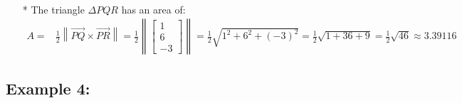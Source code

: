 \documentclass{article}
\begin{document}
\begin{itemize}
\begin{align*}
\end{align*}
\item[*] The triangle \(\Delta PQR\) has an area of:   
\begin{align*}
A = & \frac{1}{2}\left\|\overrightarrow{PQ} \times \overrightarrow{PR}\right\|  
= \frac{1}{2}\left\|\begin{bmatrix} 1 \\ 6 \\ -3 \end{bmatrix}\right\| 
= \frac{1}{2}\sqrt{1^2 + 6^2 + (-3)^2} 
= \frac{1}{2}\sqrt{1 + 36 + 9} = \frac{1}{2}\sqrt{46} \approx 3.39116
\end{align*}
\end{itemize}





\subsection*{Example 4:}
\end{document}
